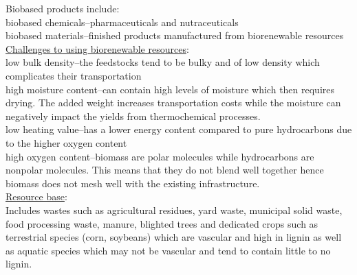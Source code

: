 \documentclass{article}\usepackage[]{graphicx}\usepackage[]{color}
\begin{document}
Biobased products include: \\ 
biobased chemicals--pharmaceuticals and nutraceuticals \\
biobased materials--finished products manufactured from biorenewable resources \\

\underline{Challenges to using biorenewable resources}: \\
low bulk density--the feedstocks tend to be bulky and of low density which complicates their transportation \\
high moisture content--can contain high levels of moisture which then requires drying.  The added weight increases transportation costs while the moisture can negatively impact the yields from thermochemical processes. \\
low heating value--has a lower energy content compared to pure hydrocarbons due to the higher oxygen content \\
high oxygen content--biomass are polar molecules while hydrocarbons are nonpolar molecules.  This means that they do not blend well together hence biomass does not mesh well with the existing infrastructure. \\

\underline{Resource base}: \\
Includes wastes such as agricultural residues, yard waste, municipal solid waste, food processing waste, manure, blighted trees and dedicated crops such as terrestrial species (corn, soybeans) which are vascular and high in lignin as well as aquatic species which may not be vascular and tend to contain little to no lignin. \\
\end{document}
